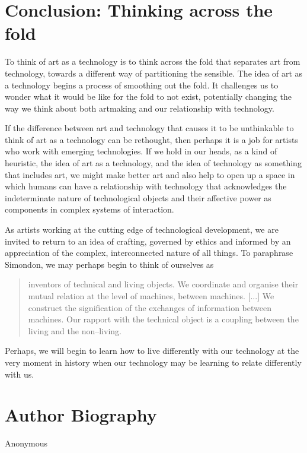 \documentclass[letterpaper]{article}
\begin{document}
\section{Conclusion: Thinking across the fold}

   To think of art as a technology is to think across the fold that separates art from technology, towards a different way of partitioning the sensible. The idea of art as a technology begins a process of smoothing out the fold. It challenges us to wonder what it would be like for the fold to not exist, potentially changing the way we think about both artmaking and our relationship with technology.
    
    If the difference between art and technology that causes it to be unthinkable to think of art as a technology can be rethought, then perhaps it is a job for artists who work with emerging technologies. If we hold in our heads, as a kind of heuristic, the idea of art as a technology, and the idea of technology as something that includes art, we might make better art and also help to open up a space in which humans can have a relationship with technology that acknowledges the indeterminate nature of technological objects and their affective power as components in complex systems of interaction.
    
    As artists working at the cutting edge of technological development, we are invited to return to an idea of crafting, governed by ethics and informed by an appreciation of the complex, interconnected nature of all things. To paraphrase Simondon, we may perhaps begin to think of ourselves as
    
    \begin{quote}
        inventors of technical and living objects. We coordinate and organise their mutual relation at the level of machines, between machines. [...] We construct the signification of the exchanges of information between machines. Our rapport with the technical object is a coupling between the living and the non–living. \citep[p.xvi]{SimondonOnThMdOfExstncOfTechnclObjcts1980}
    \end{quote}

    Perhaps, we will begin to learn how to live differently with our technology at the very moment in history when our technology may be learning to relate differently with us.
    



\section{Author Biography}

Anonymous 
\end{document}
